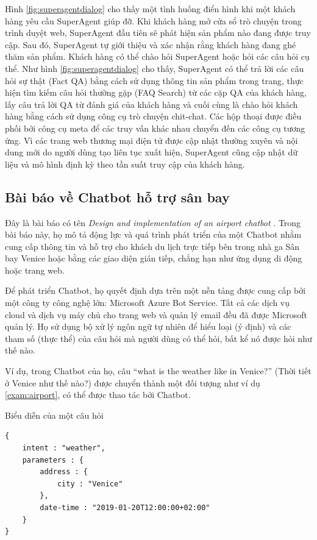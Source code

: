 Hình \ref{fig:superagentdialog} cho thấy một tình huống điển hình
khi một khách hàng yêu cầu SuperAgent giúp đỡ. Khi khách hàng mở
cửa sổ trò chuyện trong trình duyệt web, SuperAgent đầu tiên sẽ
phát hiện sản phẩm nào đang được truy cập. Sau đó, SuperAgent tự
giới thiệu và xác nhận rằng khách hàng đang ghé thăm sản phẩm.
Khách hàng có thể chào hỏi SuperAgent hoặc hỏi các câu hỏi cụ thể.
Như hình \ref{fig:superagentdialog} cho thấy, SuperAgent có thể
trả lời các câu hỏi sự thật (Fact QA) bằng cách sử dụng thông tin
sản phẩm trong trang, thực hiện tìm kiếm câu hỏi thường gặp (FAQ
Search) từ các cặp QA của khách hàng, lấy câu trả lời QA từ đánh giá
của khách hàng và cuối cùng là chào hỏi khách hàng bằng cách sử dụng
công cụ trò chuyện chit-chat. Các hộp thoại được điều phối bởi
công cụ meta để các truy vấn khác nhau chuyển đến các công cụ
tương ứng. Vì các trang web thương mại điện tử được cập nhật
thường xuyên và nội dung mới do người dùng tạo liên tục xuất hiện,
SuperAgent cũng cập nhật dữ liệu và mô hình định kỳ theo tần suất
truy cập của khách hàng.

\subsection{Bài báo về Chatbot hỗ trợ sân bay}
Đây là bài báo có tên \textit{Design and implementation of an airport
chatbot} \cite{airport}. Trong bài báo này, họ mô tả động lực và
quá trình phát triển của một Chatbot nhằm cung cấp thông tin và hỗ trợ
cho khách du lịch trực tiếp bên trong nhà ga Sân bay Venice hoặc bằng
các giao diện gián tiếp, chẳng hạn như ứng dụng di động hoặc trang web.

Để phát triển Chatbot, họ quyết định dựa trên một nền tảng được
cung cấp bởi một công ty công nghệ lớn: Microsoft Azure Bot Service.
Tất cả các dịch vụ cloud và dịch vụ máy chủ cho trang web và quản lý
email đều đã được Microsoft quản lý. Họ sử dụng bộ xử lý ngôn ngữ
tự nhiên để hiểu loại (ý định) và các tham số (thực thể) của câu hỏi
mà người dùng có thể hỏi, bất kể nó được hỏi như thế nào.

Ví dụ, trong Chatbot của họ, câu \enquote{what is the weather like in
Venice?} (Thời tiết ở Venice như thế nào?) được chuyển thành một
đối tượng như ví dụ \ref{exam:airport}, có thể được thao tác bởi
Chatbot.

\renewcommand{\textboxenvname}{Ví dụ}
\begin{textbox}{Biểu diễn của một câu hỏi}
\begin{Verbatim}[breaklines=true, breakanywhere=true]
{
    intent : "weather",
    parameters : {
        address : {
            city : "Venice"
        },
        date-time : "2019-01-20T12:00:00+02:00"
    }
}
\end{Verbatim}
\end{textbox}

